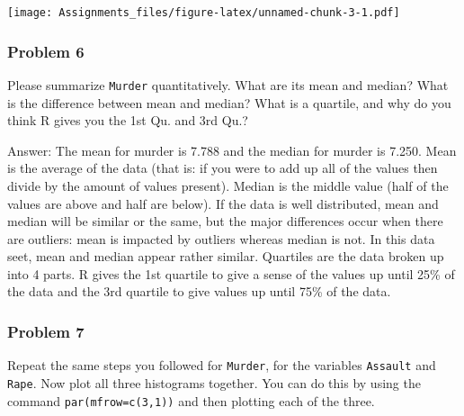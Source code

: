 \documentclass[
]{article}
\newenvironment{Shaded}{\begin{snugshade}}{\end{snugshade}}
\newcommand{\DataTypeTok}[1]{\textcolor[rgb]{0.13,0.29,0.53}{#1}}
\newcommand{\DecValTok}[1]{\textcolor[rgb]{0.00,0.00,0.81}{#1}}
\newcommand{\KeywordTok}[1]{\textcolor[rgb]{0.13,0.29,0.53}{\textbf{#1}}}
\newcommand{\NormalTok}[1]{#1}
\newcommand{\OperatorTok}[1]{\textcolor[rgb]{0.81,0.36,0.00}{\textbf{#1}}}
\newcommand{\StringTok}[1]{\textcolor[rgb]{0.31,0.60,0.02}{#1}}
\begin{document}
\texttt{[image: Assignments\_files/figure-latex/unnamed-chunk-3-1.pdf]}

\hypertarget{problem-6}{%
\subsubsection{Problem 6}\label{problem-6}}

Please summarize \texttt{Murder} quantitatively. What are its mean and
median? What is the difference between mean and median? What is a
quartile, and why do you think R gives you the 1st Qu. and 3rd Qu.?

Answer: The mean for murder is 7.788 and the median for murder is 7.250.
Mean is the average of the data (that is: if you were to add up all of
the values then divide by the amount of values present). Median is the
middle value (half of the values are above and half are below). If the
data is well distributed, mean and median will be similar or the same,
but the major differences occur when there are outliers: mean is
impacted by outliers whereas median is not. In this data seet, mean and
median appear rather similar. Quartiles are the data broken up into 4
parts. R gives the 1st quartile to give a sense of the values up until
25\% of the data and the 3rd quartile to give values up until 75\% of
the data.

\hypertarget{problem-7}{%
\subsubsection{Problem 7}\label{problem-7}}

Repeat the same steps you followed for \texttt{Murder}, for the
variables \texttt{Assault} and \texttt{Rape}. Now plot all three
histograms together. You can do this by using the command
\texttt{par(mfrow=c(3,1))} and then plotting each of the three.

\begin{Shaded}
\end{Shaded}
\end{document}
